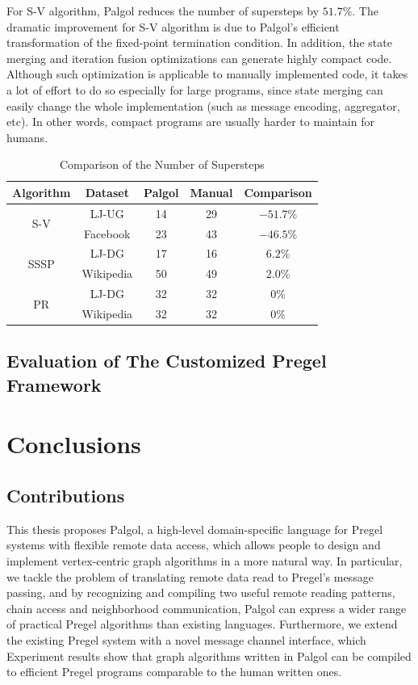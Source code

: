 \documentclass{sokendai_thesis} %
\begin{document}
For S-V algorithm, Palgol reduces the number of supersteps by $51.7\%$.
The dramatic improvement for S-V algorithm is due to Palgol's efficient transformation of the fixed-point termination condition.
In addition, the state merging and iteration fusion optimizations can generate highly compact code.
Although such optimization is applicable to manually implemented code, it takes a lot of effort to do so especially for large programs, since state merging can easily change the whole implementation (such as message encoding, aggregator, etc).
In other words, compact programs are usually harder to maintain for humans.

\begin{table}[t]
 \centering
 \caption{Comparison of the Number of Supersteps}
 \label{tab:steps}
 \begin{tabular}{c|c|c|c|c}
  \hline
  \textbf{Algorithm} & \textbf{Dataset} & Palgol & Manual & Comparison \\
  \hline\hline
  \multirow{2}{*}{S-V} & LJ-UG & 14 & 29 & $-51.7$\% \\
  \cline{2-5}
  & Facebook & 23 & 43 & $-46.5$\% \\
  \hline
  \multirow{2}{*}{SSSP} & LJ-DG & 17 & 16 & $6.2$\% \\
  \cline{2-5}
  & Wikipedia & 50 & 49 & 2.0\% \\
  \hline
  \multirow{2}{*}{PR} & LJ-DG & 32 & 32 & $0$\% \\
  \cline{2-5}
  & Wikipedia & 32 & 32 & $0$\% \\
  \hline
 \end{tabular}
\vspace{-2ex}\end{table}

\section{Evaluation of The Customized Pregel Framework}

\chapter{Conclusions}
\label{sec:conclusions}

\section{Contributions}

This thesis proposes Palgol, a high-level domain-specific language for Pregel systems with flexible remote data access, which allows people to design and implement vertex-centric graph algorithms in a more natural way.
In particular, we tackle the problem of translating remote data read to Pregel's message passing, and by recognizing and compiling two useful remote reading patterns, chain access and neighborhood communication, Palgol can express a wider range of practical Pregel algorithms than existing languages.
Furthermore, we extend the existing Pregel system with a novel message channel interface, which
Experiment results show that graph algorithms written in Palgol can be compiled to efficient Pregel programs comparable to the human written ones.
\end{document}
